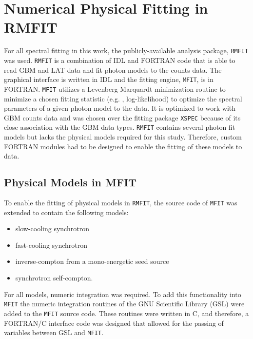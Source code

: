 \section{Numerical Physical Fitting in RMFIT}
For all spectral fitting in this work, the publicly-available analysis
package, {\tt RMFIT} \cite{rmfit} was used. {\tt RMFIT} is a
combination of IDL and FORTRAN code that is able to read GBM and LAT
data and fit photon models to the counts data. The graphical interface
is written in IDL and the fitting engine, {\tt MFIT}, is in
FORTRAN. {\tt MFIT} utilizes a Levenberg-Marquardt minimization
routine \cite{numrecipes} to minimize a chosen fitting statistic
(e.g. {\chisq}, log-likelihood) to optimize the spectral parameters of
a given photon model to the data. It is optimized to work with GBM
counts data and was chosen over the fitting package {\tt XSPEC}
\cite{xspec} because of its close association with the GBM data
types. {\tt RMFIT} contains several photon fit models but lacks the
physical models required for this study. Therefore, custom FORTRAN
modules had to be designed to enable the fitting of these models to
data.

\subsection{Physical Models in MFIT}
\label{sec:physmod:rmfit}
To enable the fitting of physical models in {\tt RMFIT}, the source
code of {\tt MFIT} was extended to contain the following models:
\begin{itemize}
\item slow-cooling synchrotron
\item fast-cooling synchrotron
\item inverse-compton from a mono-energetic seed source
\item synchrotron self-compton.
\end{itemize}
For all models, numeric integration was required. To add this
functionality into {\tt MFIT} the numeric integration routines of the
GNU Scientific Library (GSL) \cite{gsl} were added to the {\tt MFIT}
source code. These routines were written in C, and therefore, a
FORTRAN/C interface code was designed that allowed for the passing of
variables between GSL and {\tt MFIT}.

